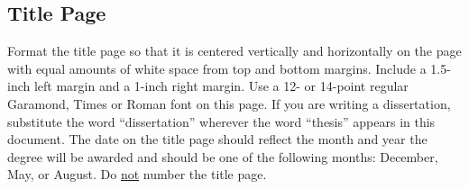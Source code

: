 \subsection{Title Page}

Format the title page so that it is centered vertically and horizontally on the
page with equal amounts of white space from top and bottom margins.  Include a
1.5-inch left margin and a 1-inch right margin.  Use a 12- or 14-point regular
Garamond, Times or Roman font on this page.  If you are writing a dissertation,
substitute the word ``dissertation'' wherever the word ``thesis'' appears in
this document.  The date on the title page should reflect the month and year
the degree will be awarded and should be one of the following months: December,
May, or August.  Do \uline{not} number the title page.

